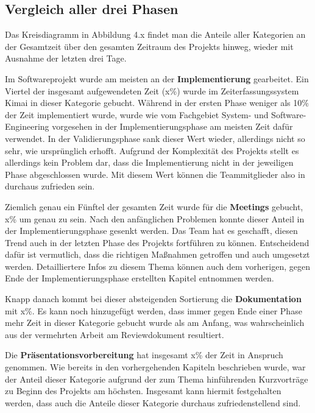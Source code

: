 \documentclass[../review_3.tex]{subfiles}
\begin{document}
\subsection{Vergleich aller drei Phasen}


Das Kreisdiagramm in Abbildung 4.x findet man die Anteile aller Kategorien an der Gesamtzeit über den gesamten Zeitraum des Projekts hinweg, wieder mit Ausnahme der letzten drei Tage.

Im Softwareprojekt wurde am meisten an der \textbf{Implementierung} gearbeitet. Ein Viertel der insgesamt aufgewendeten Zeit (x\%) wurde im Zeiterfassungssystem Kimai in dieser Kategorie gebucht. Während in der ersten Phase weniger als 10\% der Zeit implementiert wurde, wurde wie vom Fachgebiet System- und Software-Engineering vorgesehen in der Implementierungsphase am meisten Zeit dafür verwendet. In der Validierungsphase sank dieser Wert wieder, allerdings nicht so sehr, wie ursprünglich erhofft. Aufgrund der Komplexität des Projekts stellt es allerdings kein Problem dar, dass die Implementierung nicht in der jeweiligen Phase abgeschlossen wurde. Mit diesem Wert können die Teammitglieder also in durchaus zufrieden sein.

Ziemlich genau ein Fünftel der gesamten Zeit wurde für die \textbf{Meetings} gebucht, x\% um genau zu sein. Nach den anfänglichen Problemen konnte dieser Anteil in der Implementierungsphase gesenkt werden. Das Team hat es geschafft, diesen Trend auch in der letzten Phase des Projekts fortführen zu können. Entscheidend dafür ist vermutlich, dass die richtigen Maßnahmen getroffen und auch umgesetzt werden. Detailliertere Infos zu diesem Thema können auch dem vorherigen, gegen Ende der Implementierungsphase erstellten Kapitel entnommen werden.

Knapp danach kommt bei dieser absteigenden Sortierung die \textbf{Dokumentation} mit x\%. Es kann noch hinzugefügt werden, dass immer gegen Ende einer Phase mehr Zeit in dieser Kategorie gebucht wurde als am Anfang, was wahrscheinlich aus der vermehrten Arbeit am Reviewdokument resultiert.

Die \textbf{Präsentationsvorbereitung} hat insgesamt x\% der Zeit in Anspruch genommen. Wie bereits in den vorhergehenden Kapiteln beschrieben wurde, war der Anteil dieser Kategorie aufgrund der zum Thema hinführenden Kurzvorträge zu Beginn des Projekts am höchsten. Insgesamt kann hiermit festgehalten werden, dass auch die Anteile dieser Kategorie durchaus zufriedenstellend sind.
\end{document}
